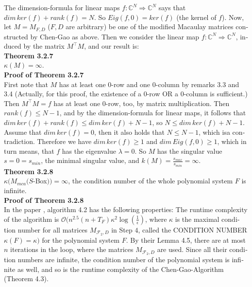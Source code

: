 \documentclass[a4paper,11pt]{article}
\begin{document}
\begin{otherlanguage}{english}
\noindent
The dimension-formula for linear maps $f: \mathbb{C}^N \Rightarrow \mathbb{C}^N$ says that $dim \, ker(f) + rank(f) = N$. So $Eig(f,0) = ker(f)$ (the kernel of $f$). Now, let $M = M_{F,D}$ ($F,D$ are arbitrary) be one of the modified Macaulay matrices constructed by Chen-Gao as above. Then we consider the linear map $f: \mathbb{C}^N \Rightarrow \mathbb{C}^N$, induced by the matrix $M^\intercal M$, and our result is: \\

\noindent
\textbf{Theorem 3.2.7} \\
$\kappa(M)=\infty$. \\

\noindent
\textbf{Proof of Theorem 3.2.7} \\
First note that $M$ has at least one $0$-row and one $0$-column by remarks 3.3 and 3.4 (Actually, for this proof, the existence of a $0$-row OR a $0$-column is sufficient.) Then $M^\intercal M = f$ has at least one $0$-row, too, by matrix multiplication. Then $rank(f) \leq N-1$, and by the dimension-formula for linear maps, it follows that $dim \,ker(f) + rank(f) \leq dim \,ker(f) + N-1$, so $N \leq dim \,ker(f) + N-1$.\\
Assume that $dim \,ker(f) = 0$, then it also holds that $N \leq N-1$, which isa contradiction. Therefore we have $dim \,ker(f) \geq 1$ and  $dim \,Eig(f,0) \geq 1$, 
which in turn means, that $f$ has the eigenvalue $\lambda = 0$. So $M$ has the singular value $s = 0 = s_{min}$, the minimal singular value, and
$k(M ) = \frac{s_{max}}{s_{min}} = \infty$. \\

\noindent
\textbf{Theorem 3.2.8} \\
$\kappa(M_{mca}(S$-Box$))=\infty$, the condition number of the whole polynomial system $F$ is infinite. \\

\noindent
\textbf{Proof of Theorem 3.2.8} \\
In the paper \cite{QAA}, algorithm 4.2 has the following properties: The runtime complexity of the algorithm is  $\mathcal{O}(n^{2.5}(n + T_F)\kappa^2 \log(\frac{1}{\epsilon})$, where $\kappa$ is the maximal condition number for all matrices $M_{\mathcal{F}_2,D}$ in Step $4$, called the CONDITION NUMBER $\kappa(F) = \kappa)$ for the polynomial system $F$. By their Lemma 4.5, there are at most $n$ iterations in the loop, where the matrices $M_{\mathcal{F}_2,D}$ are used. Since all their condition numbers are infinite, the condition number of the polynomial system is infinite as well, and so is the runtime complexity of the Chen-Gao-Algorithm (Theorem 4.3). \\



\end{otherlanguage}
\end{document}
